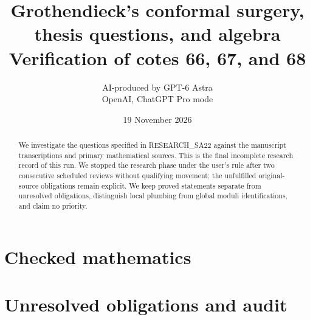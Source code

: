 \documentclass[11pt,a4paper]{article}
\title{Grothendieck's conformal surgery, thesis questions, and algebra\\\large Verification of cotes 66, 67, and 68}
\author{AI-produced by GPT-6 Astra\\\small OpenAI, ChatGPT Pro mode}
\date{19 November 2026}
\theoremstyle{definition}
\theoremstyle{remark}\newtheorem{remark}[theorem]{Remark}
\begin{document}
\maketitle
\begin{abstract}
We investigate the questions specified in RESEARCH\_SA22 against the manuscript transcriptions and primary mathematical sources. This is the final incomplete research record of this run. We stopped the research phase under the user's rule after two consecutive scheduled reviews without qualifying movement; the unfulfilled original-source obligations remain explicit. We keep proved statements separate from unresolved obligations, distinguish local plumbing from global moduli identifications, and claim no priority.
\end{abstract}
\tableofcontents\clearpage
\part{Checked mathematics}
\clearpage
\part{Unresolved obligations and audit}
\nocite{*}


\end{document}
